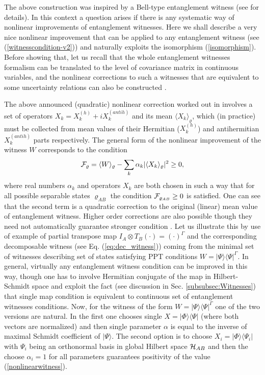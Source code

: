 \documentclass[twocolumn,aps,rmp]{revtex4}
\begin{document}
The above construction was inspired by a Bell-type entanglement
witness (see \cite{Yu} for details). In this context a question arises
if there is any systematic way of nonlinear improvements of
entanglement witnesses. Here we shall describe a very nice nonlinear
improvement that can be applied to any entanglement witness (see
(\ref{witnesscondition-v2})) and naturally exploits the isomorphism
(\ref{isomorphism}). Before showing that, let us recall that the whole
entanglement witnesses formalism can be translated to the level of
covariance matrix in continuous variables, and the nonlinear
corrections to such a witnesses that are equivalent to some
uncertainty relations can also be constructed
\cite{EisertCVNonlinearWitnesses}.

The above announced (quadratic) nonlinear correction worked out in
\cite{GuehneLutkenhaus} involves a set of operators
$X_{k}=X_{k}^{(h)} + i X_{k}^{(antih)}$ and its mean $\langle
X_{k}\rangle_\varrho$, which (in practice) must be collected from
mean values of their Hermitian ($X_{k}^{(h)}$) and antihermitian
$X_{k}^{(antih)}$ parts respectively. The general form of the
nonlinear improvement of the witness $W$ corresponds to the
condition
\begin{equation}
{\cal F}_\varrho=\langle W\rangle_\varrho - \sum_{k}
\alpha_{k}|\langle X_{k} \rangle_\varrho|^{2} \geq 0,
\label{nonlinearwitness}
\end{equation}
where real numbers $\alpha_{k}$ and operators $X_{k}$ are both
chosen in such a way that for all possible separable states
$\varrho_{AB}$ the condition ${\cal F}_{\varrho_{AB}}\geq 0$ is
satisfied. One can see that the second term is a quadratic
correction to the original (linear) mean value of entanglement
witness. Higher order corrections are also possible though they need
not automatically guarantee stronger condition
\cite{GuehneLutkenhaus}. Let us illustrate this by use of  example
of  partial transpose map $I_{A} \otimes
T_{B}(\cdot)=(\cdot)^{\Gamma}$ and the corresponding
decomposable witness (see Eq. (\ref{eq:dec_witness})) coming from the
minimal set of witnesses describing set of states satisfying PPT
conditions $W=|\Psi\rangle\langle \Psi|^{\Gamma}$.  In general,
virtually any entanglement witness condition can be improved in this
way, though one has to involve Hermitian conjugate of the map in
Hilbert-Schmidt space and exploit the fact (see discussion in
Sec. \ref{subsubsec:Witnesses}) that single map condition is
equivalent to continuous set of entanglement witnesses conditions.
Now, for the witness of the form $W=|\Psi\rangle\langle
\Psi|^{\Gamma}$ one of the two versions are natural. In
the first one chooses single $X=|\Phi\rangle\langle \Psi|$ (where
both vectors are normalized) and then single parameter $\alpha$ is
equal to the inverse of maximal Schmidt coefficient of $|\Psi
\rangle$. The second option is to choose $X_{i}=|\Phi\rangle\langle
\Psi_{i}|$ with $\Psi_{i}$ being an orthonormal basis in
global Hilbert space ${\cal H}_{AB}$ and then the choose
$\alpha_{i}=1$ for all parameters guarantees positivity of the value
(\ref{nonlinearwitness}).
\end{document}
